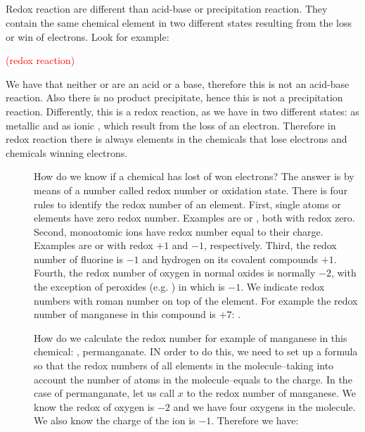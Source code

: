 \documentclass[main.tex]{subfiles}
\begin{document}
\begin{description}
\section{\color{blue!30!black}{Redox reactions}}
Redox reaction are different than acid-base or precipitation reaction. They contain the same chemical element in two different states resulting from the loss or win of electrons. Look for example:
\begin{center}    \textcolor{red}{ (redox reaction) }      \end{center}
We have that neither  or  are an acid or a base, therefore this is not an acid-base reaction. Also there is no product precipitate, hence this is not a precipitation reaction. Differently, this is a redox reaction, as we have  in two different states: as metallic  and as ionic  , which result from the loss of an electron. Therefore in redox reaction there is always elements in the chemicals that lose electrons and chemicals winning electrons.
\sloppy 
\begin{description}
\item[] How do we know if a chemical has lost of won electrons? The answer is by means of a number called redox number or oxidation state. There is four rules to identify the redox number of an element. First, single atoms or elements have zero redox number. Examples are  or , both with redox zero. Second, monoatomic ions have redox number equal to their charge. Examples are  or  with redox $+1$ and $-1$, respectively. Third, the redox number of fluorine is $-1$ and hydrogen on its covalent compounds $+1$. Fourth, the redox number of oxygen in normal oxides is normally $-2$, with the exception of peroxides (e.g. ) in which is $-1$.
We indicate redox numbers with roman number on top of the element. For example the redox number of manganese in this compound is $+7$: .
\item[] How do we calculate the redox number for example of manganese in this chemical: , permanganate. IN order to do this, we need to set up a formula so that the redox numbers of all elements in the molecule--taking into account the number of atoms in the molecule--equals to the charge. In the case of permanganate, let us call $x$ to the redox number of manganese. We know the redox of oxygen is $-2$ and we have four oxygens in the molecule. We also know the charge of the ion is $-1$. Therefore we have:

\end{description}
\end{description}
\end{document}
